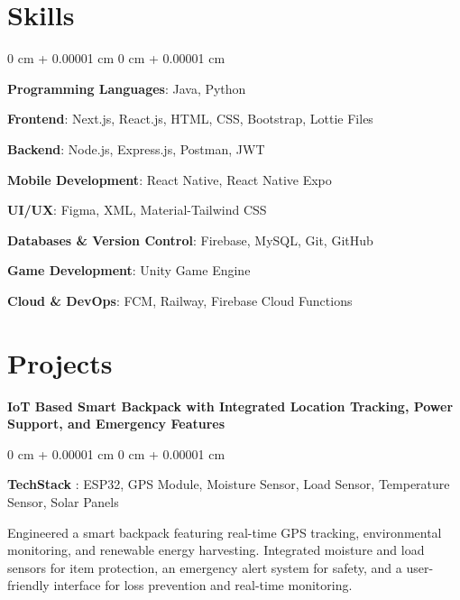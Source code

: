 \documentclass[10pt, letterpaper]{article}
\newenvironment{onecolentry}{
    \begin{adjustwidth}{
        0 cm + 0.00001 cm
    }{
        0 cm + 0.00001 cm
    }
}{
    \end{adjustwidth}
} %
\begin{document}
    \section{Skills}
    \begin{onecolentry}
        \item \textbf{Programming Languages}: Java, Python
        \item \textbf{Frontend}: Next.js, React.js, HTML, CSS, Bootstrap, Lottie Files
        \item \textbf{Backend}: Node.js, Express.js, Postman, JWT
        \item \textbf{Mobile Development}: React Native, React Native Expo
        \item \textbf{UI/UX}: Figma, XML, Material-Tailwind CSS
        \item \textbf{Databases \& Version Control}: Firebase, MySQL, Git, GitHub
        \item \textbf{Game Development}: Unity Game Engine
        \item \textbf{Cloud \& DevOps}: FCM, Railway, Firebase Cloud Functions
\end{onecolentry}

   \section{Projects}
        \begin{samepage}
                \textbf{IoT Based Smart Backpack with Integrated Location Tracking, Power Support, and Emergency Features  }
            \vspace{0.05 cm}
            
            \begin{onecolentry}
               \textbf{TechStack} :  ESP32, GPS Module, Moisture Sensor, Load Sensor, Temperature Sensor, Solar Panels 

                \vspace{0.05 cm}
                Engineered a smart backpack featuring real-time GPS tracking, environmental monitoring, and renewable energy harvesting. Integrated moisture and load sensors for item protection, an emergency alert system for safety, and a user-friendly interface for loss prevention and real-time monitoring. 
        \end{onecolentry}
        \end{samepage}
         \vspace{0.3 cm}
         
\end{document}
